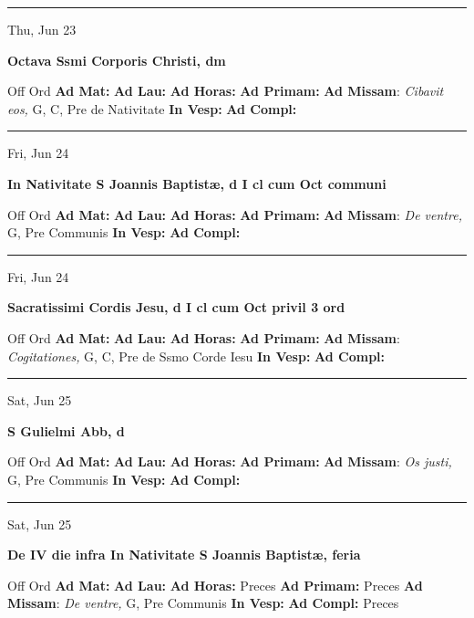 \documentclass[letterpaper, 10pt]{article}
\begin{document}
\hrule
\begin{center}
Thu, Jun 23
\end{center}\textbf{ \large Octava Ssmi Corporis Christi, \textnormal{\normalsize dm}}
\begin{justify}
Off Ord
\textbf{Ad Mat: }
\textbf{Ad Lau: }
\textbf{Ad Horas: }
\textbf{Ad Primam: }
\textbf{Ad Missam}: \textit{Cibavit eos,} G, C, Pre de Nativitate
\textbf{In Vesp: }
\textbf{Ad Compl: }\end{justify}



\hrule
\begin{center}
Fri, Jun 24
\end{center}\textbf{ \large In Nativitate S Joannis Baptistæ, \textnormal{\normalsize d I cl cum Oct communi}}
\begin{justify}
Off Ord
\textbf{Ad Mat: }
\textbf{Ad Lau: }
\textbf{Ad Horas: }
\textbf{Ad Primam: }
\textbf{Ad Missam}: \textit{De ventre,} G, Pre Communis
\textbf{In Vesp: }
\textbf{Ad Compl: }\end{justify}



\hrule
\begin{center}
Fri, Jun 24
\end{center}\textbf{ \large Sacratissimi Cordis Jesu, \textnormal{\normalsize d I cl cum Oct privil 3 ord}}
\begin{justify}
Off Ord
\textbf{Ad Mat: }
\textbf{Ad Lau: }
\textbf{Ad Horas: }
\textbf{Ad Primam: }
\textbf{Ad Missam}: \textit{Cogitationes,} G, C, Pre de Ssmo Corde Iesu
\textbf{In Vesp: }
\textbf{Ad Compl: }\end{justify}



\hrule
\begin{center}
Sat, Jun 25
\end{center}\textbf{ \large S Gulielmi Abb, \textnormal{\normalsize d}}
\begin{justify}
Off Ord
\textbf{Ad Mat: }
\textbf{Ad Lau: }
\textbf{Ad Horas: }
\textbf{Ad Primam: }
\textbf{Ad Missam}: \textit{Os justi,} G, Pre Communis
\textbf{In Vesp: }
\textbf{Ad Compl: }\end{justify}



\hrule
\begin{center}
Sat, Jun 25
\end{center}\textbf{ \large De IV die infra In Nativitate S Joannis Baptistæ, \textnormal{\normalsize feria}}
\begin{justify}
Off Ord
\textbf{Ad Mat: }
\textbf{Ad Lau: }
\textbf{Ad Horas: }Preces
\textbf{Ad Primam: }Preces
\textbf{Ad Missam}: \textit{De ventre,} G, Pre Communis
\textbf{In Vesp: }
\textbf{Ad Compl: }Preces\end{justify}
\end{document}
